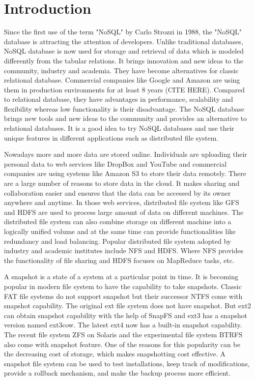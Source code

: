 \chapter{Introduction}
\label{chap:intro}

    Since the first use of the term "NoSQL" by Carlo Strozzi in 1988, the "NoSQL" database is attracting the attention of developers. Unlike traditional databases, NoSQL database is now used for storage and retrieval of data which is modeled differently from the tabular relations. It brings innovation and new ideas to the community, industry and academia. They have become alternatives for classic relational database. Commercial companies like Google and Amazon are using them in production environments for at least 8 years (CITE HERE). Compared to relational database, they have advantages in performance, scalability and flexibility whereas low functionality is their disadvantage. The NoSQL database brings new tools and new ideas to the community and provides an alternative to relational databases. It is a good idea to try NoSQL databases and use their unique features in different applications such as distributed file system.

    Nowadays more and more data are stored online. Individuals are uploading their personal data to web services like DropBox and YouTube and commercial companies are using systems like Amazon S3 to store their data remotely. There are a large number of reasons to store data in the cloud. It makes sharing and collaboration easier and ensures that the data can be accessed by its owner anywhere and anytime. In those web services, distributed file system like GFS and HDFS are used to process large amount of data on different machines. The distributed file system can also combine storage on different machine into a logically unified volume and at the same time can provide functionalities like redundancy and load balancing. Popular distributed file system adopted by industry and academic institutes include NFS and HDFS. Where NFS provides the functionality of file sharing and HDFS focuses on MapReduce tasks, etc.

    A snapshot is a state of a system at a particular point in time. It is becoming popular in modern file system to have the capability to take snapshots. Classic FAT file systems do not support snapshot but their successor NTFS come with snapshot capability. The original ext file system does not have snapshot. But ext2 can obtain snapshot capability with the help of SnapFS and ext3 has a snapshot version named ext3cow. The latest ext4 now has a built-in snapshot capability. The recent file system ZFS on Solaris and the experimental file system BTRFS also come with snapshot feature. One of the reasons for this popularity can be the decreasing cost of storage, which makes snapshotting cost effective. A snapshot file system can be used to test installations, keep track of modifications, provide a rollback mechanism, and make the backup process more efficient.

